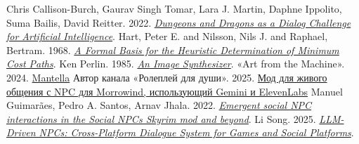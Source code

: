 \documentclass[14pt]{extarticle}
\begin{document}
\begin{thebibliography}{9}
Chris Callison-Burch, Gaurav Singh Tomar, Lara J. Martin, Daphne Ippolito, Suma Bailis, David Reitter. 2022. \emph{\href{https://arxiv.org/abs/2210.07109}{Dungeons and Dragons as a Dialog Challenge for Artificial Intelligence}}.
Hart, Peter E. and Nilsson, Nils J. and Raphael, Bertram. 1968. \emph{\href{https://ieeexplore.ieee.org/document/4082128}{A Formal Basis for the Heuristic Determination of Minimum Cost Paths}}.
Ken Perlin. 1985. \emph{\href{https://www.cs.drexel.edu/~deb39/Classes/Papers/p287-perlin.pdf}{An Image Synthesizer}}.
«Art from the Machine».  2024. \href{https://art-from-the-machine.github.io/Mantella/index.html}{Mantella}
Автор канала «Ролеплей для души». 2025. \href{https://www.youtube.com/watch?v=fJZOXP69L6w&t=18s}{Мод для живого общения с NPC для Morrowind, использующий Gemini и ElevenLabs}
Manuel Guimarães, Pedro A. Santos, Arnav Jhala. 2022. \emph{\href{https://arxiv.org/abs/2207.13398}{Emergent social NPC interactions in the Social NPCs Skyrim mod and beyond}}.
Li Song. 2025. \emph{\href{https://arxiv.org/html/2504.13928v1}{LLM-Driven NPCs: Cross-Platform Dialogue System for Games and Social Platforms}}.
\end{thebibliography}
\end{document}
